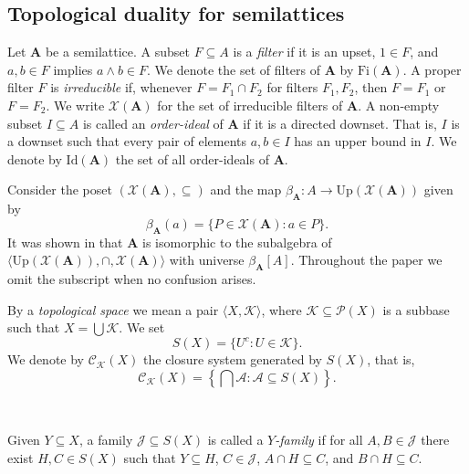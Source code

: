 \documentclass{article}
\begin{document}
\subsection{Topological duality for semilattices}

Let $\mathbf{A}$ be a semilattice. A subset $F \subseteq A$ is a \emph{filter} if it is an upset, $1 \in F$, and $a,b \in F$ implies $a \wedge b \in F$. We denote the set of filters of $\mathbf{A}$ by $\mathrm{Fi}(\mathbf{A})$. A proper filter $F$ is \emph{irreducible} if, whenever $F = F_1 \cap F_2$ for filters $F_1, F_2$, then $F = F_1$ or $F = F_2$. We write $\mathcal{X}(\mathbf{A})$ for the set of irreducible filters of $\mathbf{A}$. A non-empty subset $I \subseteq A$ is called an \emph{order-ideal} of $\mathbf{A}$ if it is a directed downset. That is, $I$ is a downset such that every pair of elements $a,b\in I$ has an upper bound in $I$. We denote by $\mathrm{Id}(\mathbf{A})$ the set of all order-ideals of $\mathbf{A}$.

Consider the poset $(\mathcal{X}(\mathbf{A}), \subseteq)$ and the map $\beta_{\mathbf{A}} \colon A \to \mathrm{Up}(\mathcal{X}(\mathbf{A}))$ given by
\[
\beta_{\mathbf{A}}(a) = \{P \in \mathcal{X}(\mathbf{A}) : a \in P\}.
\]
It was shown in \cite{CG} that $\mathbf{A}$ is isomorphic to the subalgebra of $\langle\mathrm{Up}(\mathcal{X}(\mathbf{A})), \cap, \mathcal{X}(\mathbf{A})\rangle$ with universe $\beta_{\mathbf{A}}[A]$. Throughout the paper we omit the subscript when no confusion arises.

\medskip

By a \emph{topological space} we mean a pair $\langle X,\mathcal{K}\rangle$, where $\mathcal{K} \subseteq \mathcal{P}(X)$ is a subbase such that $X = \bigcup \mathcal{K}$. We set
\[
S(X) = \{U^c : U \in \mathcal{K}\}.
\]
We denote by $\mathcal{C}_{\mathcal{K}}(X)$ the closure system generated by $S(X)$, that is,
\[
\mathcal{C}_{\mathcal{K}}(X) = \left\{ \bigcap \mathcal{A} : \mathcal{A} \subseteq S(X) \right\}.
\] 

\

Given $Y \subseteq X$, a family $\mathcal{J} \subseteq S(X)$ is called a \emph{$Y$-family} if for all $A,B \in \mathcal{J}$ there exist $H,C \in S(X)$ such that $Y \subseteq H$, $C \in \mathcal{J}$, $A \cap H \subseteq C$, and $B \cap H \subseteq C$.

\
\end{document}
